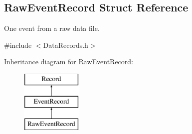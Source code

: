\hypertarget{structRawEventRecord}{
\subsection{RawEventRecord Struct Reference}
\label{structRawEventRecord}
}


One event from a raw data file.  




{\ttfamily \#include $<$DataRecords.h$>$}

Inheritance diagram for RawEventRecord:\begin{figure}[H]
\begin{center}
\leavevmode
\includegraphics[height=3.000000cm]{structRawEventRecord}
\end{center}
\end{figure}
